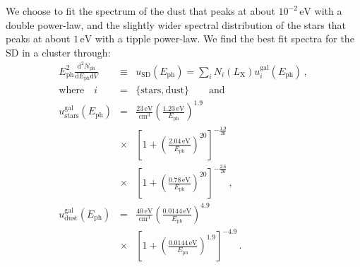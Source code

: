 \documentclass[10pt,aps,pra,reprint,amsmath,amsfonts,amssymb,showpacs]{revtex4-1}
\newcommand{\rmn}{\mathrm}
\newcommand{\ph}{\rmn{ph}}
\newcommand{\eph}{E_\ph}
\newcommand{\gal}{\rmn{gal}}
\newcommand{\sd}{\rmn{SD}}
\newcommand{\stars}{\rmn{stars}}
\newcommand{\dust}{\rmn{dust}}
\newcommand{\lx}{L_\rmn{X}}
\newcommand{\ev}{\rmn{eV}}
\newcommand{\dd}{\rmn{d}}
\begin{document}
We choose to fit the spectrum of the dust that peaks at about
$10^{-2}\,\ev$ with a double power-law, and the slightly wider
spectral distribution of the stars that peaks at about $1\,\ev$ with a
tipple power-law. We find the best fit spectra for the SD in a
cluster through:
\begin{eqnarray}
  \eph^2\frac{\dd^2 N_\ph}{\dd \eph \dd V}
  &\equiv& u_\sd(\eph) =  \sum_i N_i(\lx) u_i^\gal(\eph)\,,\nonumber \\ 
\rmn{where}\quad i&=&\{\rmn{stars,dust}\} \qquad \rmn{and}\\ 
  u_\stars^\gal(\eph) &=& \frac{23\,\rmn{eV}}{\rmn{cm}^3} 
  \left(\frac{1.23\,\rmn{eV}}{\eph}\right)^{1.9} \nonumber \\
  &\times&\left[1+\left(\frac{2.04\,\rmn{eV}}{\eph}\right)^{20}\right]
  ^{-\frac{1.9}{20}}\nonumber \\
  &\times& \left[1+\left(\frac{0.78\,\rmn{eV}}{\eph}\right)^{20}\right]^{-\frac{2.6}{20}}\,, \\
  u_\dust^\gal(\eph) &=& 
  \frac{40\,\rmn{eV}}{\rmn{cm}^3} 
  \left(\frac{0.0144\,\rmn{eV}}{\eph}\right)^{4.9}\nonumber \\
  &\times& \left[1+\left(\frac{0.0144\,\rmn{eV}}{\eph}\right)^{1.9}\right]^{-4.9}\,.
\end{eqnarray}
\end{document}
